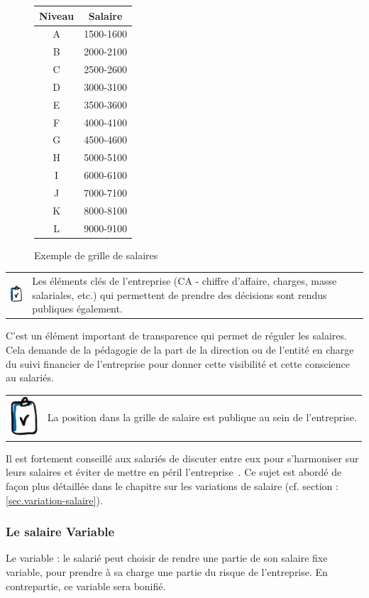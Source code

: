 \documentclass[12pt]{article}
\newcommand{\regle}[1]{%
  \begin{tcolorbox}[colframe=DarkOrange,boxrule=2pt,arc=4pt,left=6pt,right=6pt,top=6pt,bottom=6pt,boxsep=0pt,colback=Aluminium1]
    \begin{tabular}{m{1.0cm} m{11.5cm}}
      \includegraphics[width=1.0cm]{includes/rules} & #1 \\
    \end{tabular}
  \end{tcolorbox}
}
\begin{document}
\begin{figure}
  \begin{center}
  \begin{tabular}{| c | c |}
    \hline
    Niveau & Salaire \\ 
    \hline
    A & 1500-1600 \\
    \hline
    B & 2000-2100 \\
    \hline
    C & 2500-2600 \\
    \hline
    D & 3000-3100 \\
    \hline
    E & 3500-3600 \\
    \hline
    F & 4000-4100 \\
    \hline
    G & 4500-4600 \\
    \hline
    H & 5000-5100 \\
    \hline
    I & 6000-6100 \\
    \hline
    J & 7000-7100 \\
    \hline
    K & 8000-8100 \\
    \hline
    L & 9000-9100 \\
    \hline
  \end{tabular}
  \end{center}
  \caption{Exemple de grille de salaires}
  \label{grille}
\end{figure}

\regle{Les éléments clés de l’entreprise (CA - chiffre d’affaire, charges, masse salariales, etc.) qui permettent de prendre des décisions sont rendus publiques également.}

 C’est un élément important de transparence qui permet de réguler les salaires. Cela demande de la pédagogie de la part de la direction ou de l’entité en charge du suivi financier de l’entreprise pour donner cette visibilité et cette conscience au salariés.

 \regle{La position dans la grille de salaire est publique au sein de l’entreprise.}

 Il est fortement conseillé aux salariés de discuter entre eux pour s’harmoniser sur leurs salaires et éviter de mettre en péril l’entreprise~\cite{Gore}. Ce sujet est abordé de façon plus détaillée dans le chapitre sur les variations de salaire (cf. section : \ref{sec.variation-salaire}).

 \subsubsection{Le salaire Variable}
 Le variable : le salarié peut choisir de rendre une partie de son salaire fixe variable, pour prendre à sa charge une partie du risque de l’entreprise. En contrepartie, ce variable sera bonifié. 
\end{document}
